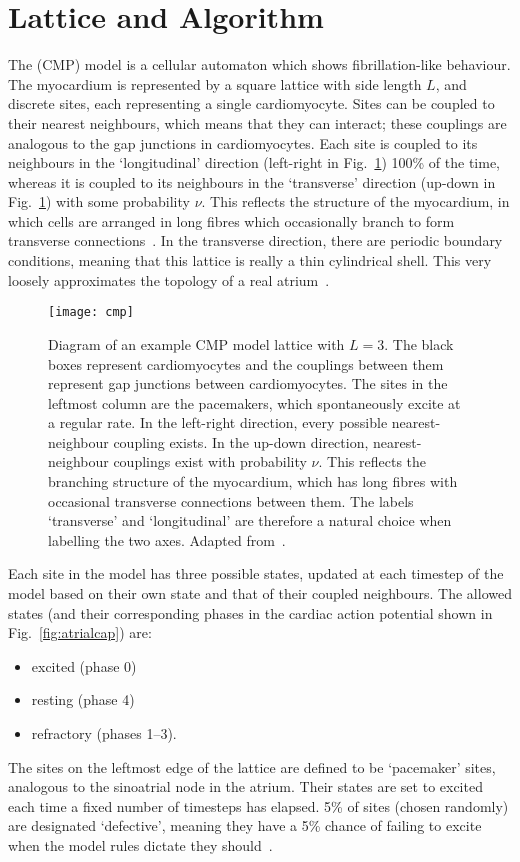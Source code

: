 \section{Lattice and Algorithm} \label{sec:cmpalgo}

The \cmp (CMP) model is a cellular automaton which shows fibrillation-like behaviour. The myocardium is represented by a square lattice with side length $L$, and discrete sites, each representing a single cardiomyocyte. Sites can be coupled to their nearest neighbours, which means that they can interact; these couplings are analogous to the gap junctions in cardiomyocytes. Each site is coupled to its neighbours in the `longitudinal' direction (left-right in Fig.~\ref{fig:cmp}) 100\% of the time, whereas it is coupled to its neighbours in the `transverse' direction (up-down in Fig.~\ref{fig:cmp}) with some probability $\nu$. This reflects the structure of the myocardium, in which cells are arranged in long fibres which occasionally branch to form transverse connections~\cite{de2011fibrosis}. In the transverse direction, there are periodic boundary conditions, meaning that this lattice is really a thin cylindrical shell. This very loosely approximates the topology of a real atrium~\cite{cmp}.

 \begin{figure}[b!] \begin{mdframed}
 	\centering
 	\texttt{[image: cmp]}
 	\caption{Diagram of an example CMP model lattice with $L=3$. The black boxes represent cardiomyocytes and the couplings between them represent gap junctions between cardiomyocytes. The sites in the leftmost column are the pacemakers, which spontaneously excite at a regular rate. In the left-right direction, every possible nearest-neighbour coupling exists. In the up-down direction, nearest-neighbour couplings exist with probability $\nu$. This reflects the branching structure of the myocardium, which has long fibres with occasional transverse connections between them. The labels `transverse' and `longitudinal' are therefore a natural choice when labelling the two axes. Adapted from~\cite{cmp}.}
 	\label{fig:cmp}
 \end{mdframed} \end{figure}

Each site in the model has three possible states, updated at each timestep of the model based on their own state and that of their coupled neighbours. The allowed states (and their corresponding phases in the cardiac action potential shown in Fig.~\ref{fig:atrialcap}) are:
\begin{itemize}
    \item excited (phase 0)
    \item resting (phase 4)
    \item refractory (phases 1--3).
\end{itemize}
The sites on the leftmost edge of the lattice are defined to be `pacemaker' sites, analogous to the sinoatrial node in the atrium. Their states are set to excited each time a fixed number of timesteps has elapsed.
5\% of sites (chosen randomly) are designated `defective', meaning they have a 5\% chance of failing to excite when the model rules dictate they should~\cite{cmp}.

